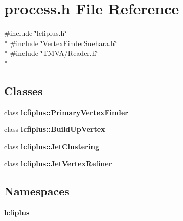 \section{process.\-h File Reference}
\label{process_8h}
{\ttfamily \#include \char`\"{}lcfiplus.\-h\char`\"{}}\\*
{\ttfamily \#include \char`\"{}Vertex\-Finder\-Suehara.\-h\char`\"{}}\\*
{\ttfamily \#include \char`\"{}T\-M\-V\-A/\-Reader.\-h\char`\"{}}\\*
\subsection*{Classes}
\begin{DoxyCompactItemize}
\item 
class {\bf lcfiplus\-::\-Primary\-Vertex\-Finder}
\item 
class {\bf lcfiplus\-::\-Build\-Up\-Vertex}
\item 
class {\bf lcfiplus\-::\-Jet\-Clustering}
\item 
class {\bf lcfiplus\-::\-Jet\-Vertex\-Refiner}
\end{DoxyCompactItemize}
\subsection*{Namespaces}
\begin{DoxyCompactItemize}
\item 
{\bf lcfiplus}
\end{DoxyCompactItemize}
